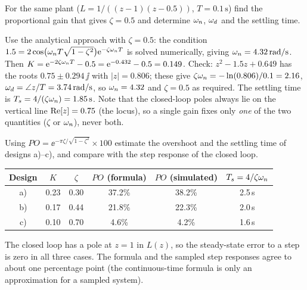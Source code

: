 \begin{problem}
For the same plant ($L=1/((z-1)(z-0.5))$, $T=0.1\,\mathrm{s}$) find the proportional gain that gives
$\zeta=0.5$ and determine $\omega_n$, $\omega_d$ and the settling time.
\end{problem}
\begin{solution}
Use the analytical approach with $\zeta=0.5$: the condition $1.5=2\cos\bigl(\omega_n T\sqrt{1-\zeta^{2}}\bigr)\mathrm{e}^{-\zeta\omega_n T}$
is solved numerically, giving $\omega_n=4.32\,\mathrm{rad/s}$. Then $K=\mathrm{e}^{-2\zeta\omega_n T}-0.5=\mathrm{e}^{-0.432}-0.5=0.149$.
Check: $z^{2}-1.5z+0.649$ has the roots $0.75\pm0.294\,\jj$ with $|z|=0.806$; these give
$\zeta\omega_n=-\ln(0.806)/0.1=2.16$, $\omega_d=\angle z/T=3.74\,\mathrm{rad/s}$, so $\omega_n=4.32$ and $\zeta=0.5$ as required.
The settling time is $T_s=4/(\zeta\omega_n)=1.85\,\mathrm{s}$. Note that the closed-loop poles always lie on the
vertical line $\operatorname{Re}[z]=0.75$ (the locus), so a single gain fixes only \emph{one} of the two quantities
($\zeta$ or $\omega_n$), never both.
\end{solution}

\begin{problem}
Using $PO=\ee^{-\pi\zeta/\sqrt{1-\zeta^{2}}}\times100$ estimate the overshoot and the settling time of designs
a)--c), and compare with the step response of the closed loop.
\end{problem}
\begin{solution}
\begin{center}
\renewcommand{\arraystretch}{1.25}
\begin{tabular}{c c c c c c}
Design & $K$ & $\zeta$ & $PO$ (formula) & $PO$ (simulated) & $T_s=4/\zeta\omega_n$\\\hline
a) & 0.23 & 0.30 & 37.2\% & 38.2\% & 2.5\,s\\
b) & 0.17 & 0.44 & 21.8\% & 22.3\% & 2.0\,s\\
c) & 0.10 & 0.70 & 4.6\% & 4.2\% & 1.6\,s
\end{tabular}
\end{center}
The closed loop has a pole at $z=1$ in $L(z)$, so the steady-state error to a step is zero in all three
cases. The formula and the sampled step responses agree to about one percentage point (the continuous-time
formula is only an approximation for a sampled system).
\end{solution}
